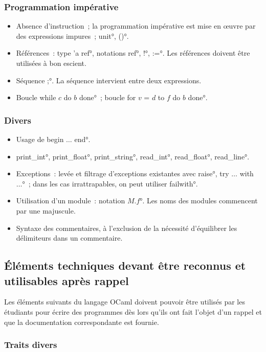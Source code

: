 \subsubsection*{Programmation impérative}
\begin{itemize}
\item Absence d'instruction~; la programmation impérative est mise en \oe uvre par des expressions impures~; \°unit°, \°()°.
\item Références~: type \°'a ref°, notations \°ref°, \°!°, \°:=°. Les références doivent être utilisées à bon escient.
\item Séquence \°;°. La séquence intervient entre deux expressions.
\item Boucle \°while $c$ do $b$ done°~; boucle \°for $v$ = $d$ to $f$ do $b$ done°.
\end{itemize}

\subsubsection*{Divers}
\begin{itemize}
\item Usage de \°begin $…$ end°.
\item \°print_int°, \°print_float°, \°print_string°, \°read_int°, \°read_float°, \°read_line°.
\item Exceptions~: levée et filtrage d'exceptions existantes avec \°raise°, \°try $\dots$ with $\dots$°~; dans les cas irrattrapables, on peut utiliser \°failwith°.
\item Utilisation d'un module~: notation \°$M$.$f$°. Les noms des modules commencent par une majuscule.
\item Syntaxe des commentaires, à l'exclusion de la nécessité d'équilibrer les délimiteurs dans un commentaire.
\end{itemize}

\subsection{Éléments techniques devant être reconnus et utilisables après rappel}
Les éléments suivants du langage OCaml doivent pouvoir être utilisés par les étudiants pour écrire des programmes dès lors qu'ils ont fait l'objet d'un rappel et que la documentation correspondante est fournie.

\subsubsection*{Traits divers}

